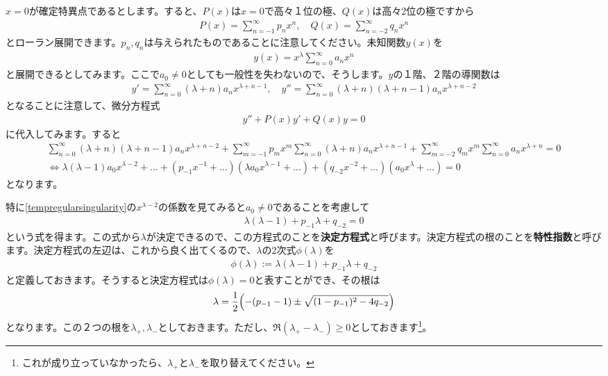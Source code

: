 \documentclass[report,paper=a4, fontsize=12pt, line_length=16cm, number_of_lines=33,dvipdfmx]{jlreq}
\numberwithin{equation}{section}
\newcommand{\strong}[1]{\textsf{\bfseries #1}}
\begin{document}
$x=0$が確定特異点であるとします。すると、$P(x)$は$x=0$で高々１位の極、$Q(x)$は高々2位の極ですから
\begin{align}
  P(x)=\sum_{n=-1}^{\infty}p_{n}x^{n},\quad
  Q(x)=\sum_{n=-2}^{\infty}q_{n}x^{n}
\end{align}
とローラン展開できます。$p_n,q_n$は与えられたものであることに注意してください。未知関数$y(x)$を
\begin{align}
  y(x)=x^{\lambda}\sum_{n=0}^{\infty}a_n x^n
\end{align}
と展開できるとしてみます。ここで$a_0\ne 0$としても一般性を失わないので、そうします。$y$の１階、２階の導関数は
\begin{align}
  y'=\sum_{n=0}^{\infty}(\lambda+n)a_nx^{\lambda+n-1},\quad y''=\sum_{n=0}^{\infty}(\lambda+n)(\lambda+n-1) a_n x^{\lambda+n-2}
\end{align}
となることに注意して、微分方程式
\begin{align}
  y''+P(x)y'+Q(x)y=0
\end{align}
に代入してみます。すると
\begin{align}
  \sum_{n=0}^{\infty}(\lambda+n)(\lambda+n-1) a_n x^{\lambda+n-2}+\sum_{m=-1}^{\infty}p_{m}x^{m}\sum_{n=0}^{\infty}(\lambda+n)a_nx^{\lambda+n-1}+\sum_{m=-2}^{\infty}q_{m}x^{m}\sum_{n=0}^{\infty}a_n x^{\lambda+n}=0\nonumber\\
  \Leftrightarrow
  \lambda(\lambda-1)a_0x^{\lambda-2}+\dots
  +(p_{-1}x^{-1}+\dots)(\lambda a_0 x^{\lambda-1}+\dots)+
  (q_{-2}x^{-2}+\dots)(a_0x^{\lambda}+\dots)=0
  \label{tempregularsingularity}
\end{align}
となります。

特に\eqref{tempregularsingularity}の$x^{\lambda-2}$の係数を見てみると$a_0\ne 0$であることを考慮して
\begin{align}
  \lambda(\lambda-1)+p_{-1}\lambda+q_{-2}=0\label{tempdetermining}
\end{align}
という式を得ます。この式から$\lambda$が決定できるので、この方程式のことを\strong{決定方程式}と呼びます。決定方程式の根のことを\strong{特性指数}と呼びます。決定方程式の左辺は、これから良く出てくるので、$\lambda$の2次式$\phi(\lambda)$を
\begin{align}
  \phi(\lambda):=\lambda(\lambda-1)+p_{-1}\lambda+q_{-2}
\end{align}
と定義しておきます。そうすると決定方程式は$\phi(\lambda)=0$と表すことができ、その根は
\begin{align}
  \lambda=\frac12\qty(
    -(p_{-1}-1)\pm \sqrt{(1-p_{-1})^2-4q_{-2}}
  )
\end{align}
となります。この２つの根を$\lambda_{+},\lambda_{-}$としておきます。ただし、$\Re (\lambda_{+}-\lambda_{-})\ge 0$としておきます\footnote{これが成り立っていなかったら、$\lambda_{+}$と$\lambda_{-}$を取り替えてください。}。
\end{document}

